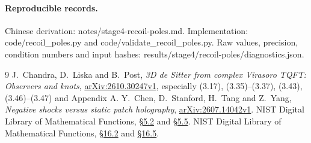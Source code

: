 \documentclass[11pt,a4paper]{article}
\begin{document}
\paragraph{Reproducible records.}
Chinese derivation: notes/stage4-recoil-poles.md.
Implementation: code/recoil\_poles.py and code/validate\_recoil\_poles.py.
Raw values, precision, condition numbers and input hashes:
results/stage4/recoil-poles/diagnostics.json.

\begin{thebibliography}{9}
J.~Chandra, D.~Liska and B.~Post,
\emph{3D de Sitter from complex Virasoro TQFT: Observers and knots},
\href{https://arxiv.org/abs/2610.30247v1}{arXiv:2610.30247v1},
especially (3.17), (3.35)--(3.37), (3.43), (3.46)--(3.47) and Appendix A.
Y.~Chen, D.~Stanford, H.~Tang and Z.~Yang,
\emph{Negative shocks versus static patch holography},
\href{https://arxiv.org/abs/2607.14042v1}{arXiv:2607.14042v1}.
NIST Digital Library of Mathematical Functions,
\href{https://dlmf.nist.gov/5.2}{\S5.2} and
\href{https://dlmf.nist.gov/5.5}{\S5.5}.
NIST Digital Library of Mathematical Functions,
\href{https://dlmf.nist.gov/16.2}{\S16.2} and
\href{https://dlmf.nist.gov/16.5}{\S16.5}.
\end{thebibliography}
\end{document}
